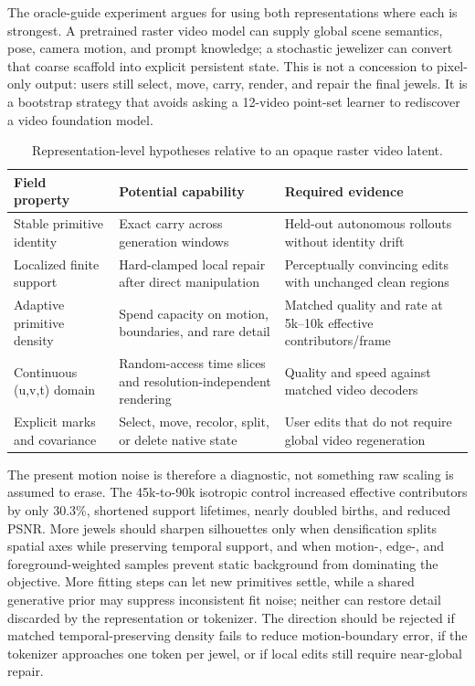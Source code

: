 \documentclass[10pt]{article}
\newcommand{\uvt}{(u,v,t)}
\begin{document}
The oracle-guide experiment argues for using both representations where each is strongest. A
pretrained raster video model can supply global scene semantics, pose, camera motion, and prompt
knowledge; a stochastic jewelizer can convert that coarse scaffold into explicit persistent state.
This is not a concession to pixel-only output: users still select, move, carry, render, and repair
the final jewels. It is a bootstrap strategy that avoids asking a 12-video point-set learner to
rediscover a video foundation model.

\begin{table}[H]
\centering
\small
\caption{Representation-level hypotheses relative to an opaque raster video latent.}
\label{tab:field-advantages}
\begin{tabularx}{\linewidth}{@{}lXX@{}}
\toprule
Field property & Potential capability & Required evidence \\
\midrule
Stable primitive identity & Exact carry across generation windows & Held-out autonomous rollouts without identity drift \\
Localized finite support & Hard-clamped local repair after direct manipulation & Perceptually convincing edits with unchanged clean regions \\
Adaptive primitive density & Spend capacity on motion, boundaries, and rare detail & Matched quality and rate at 5k--10k effective contributors/frame \\
Continuous \uvt{} domain & Random-access time slices and resolution-independent rendering & Quality and speed against matched video decoders \\
Explicit marks and covariance & Select, move, recolor, split, or delete native state & User edits that do not require global video regeneration \\
\bottomrule
\end{tabularx}
\end{table}

The present motion noise is therefore a diagnostic, not something raw scaling is assumed to erase.
The 45k-to-90k isotropic control increased effective contributors by only 30.3\%, shortened support
lifetimes, nearly doubled births, and reduced PSNR. More jewels should sharpen silhouettes only when
densification splits spatial axes while preserving temporal support, and when motion-, edge-, and
foreground-weighted samples prevent static background from dominating the objective. More fitting
steps can let new primitives settle, while a shared generative prior may suppress inconsistent fit
noise; neither can restore detail discarded by the representation or tokenizer. The direction
should be rejected if matched temporal-preserving density fails to reduce motion-boundary error, if
the tokenizer approaches one token per jewel, or if local edits still require near-global repair.
\end{document}
